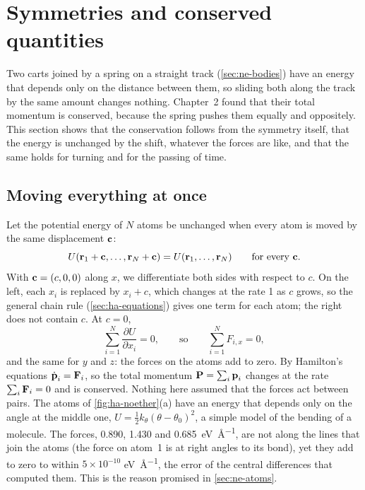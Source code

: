 \section{Symmetries and conserved quantities}
\label{sec:ha-noether}

Two carts joined by a spring on a straight track (\cref{sec:ne-bodies})
have an energy that depends only on the distance between them, so sliding
both along the track by the same amount changes nothing. Chapter~2 found
that their total momentum is conserved, because the spring pushes them
equally and oppositely. This section shows that the conservation follows
from the symmetry itself, that the energy is unchanged by the shift,
whatever the forces are like, and that the same holds for turning and for
the passing of time.

\subsection*{Moving everything at once}

Let the potential energy of $N$ atoms be unchanged when every atom is
moved by the same displacement $\bm{\mathrm{c}}$:
\begin{equation*}
   U(\bm{\mathrm{r}}_1 + \bm{\mathrm{c}}, \dots, \bm{\mathrm{r}}_N + \bm{\mathrm{c}})
   = U(\bm{\mathrm{r}}_1, \dots, \bm{\mathrm{r}}_N)
   \qquad\text{for every } \bm{\mathrm{c}} .
\end{equation*}
With $\bm{\mathrm{c}} = (c, 0, 0)$ along $x$, we differentiate both sides with
respect to $c$. On the left, each $x_i$ is replaced by $x_i + c$, which
changes at the rate 1 as $c$ grows, so the general chain rule
(\cref{sec:ha-equations}) gives one term for each atom; the right does
not contain $c$. At $c = 0$,
\begin{equation*}
   \sum_{i=1}^{N}\frac{\partial U}{\partial x_i} = 0 ,
   \qquad\text{so}\qquad
   \sum_{i=1}^{N}F_{i,x} = 0 ,
\end{equation*}
and the same for $y$ and $z$: the forces on the atoms add to zero. By
Hamilton's equations $\dot{\bm{\mathrm{p}}}_i = \bm{\mathrm{F}}_i$, so the total momentum
$\bm{\mathrm{P}} = \sum_i\bm{\mathrm{p}}_i$ changes at the rate $\sum_i\bm{\mathrm{F}}_i = 0$ and is
conserved. Nothing here assumed that the forces act between pairs. The
atoms of \cref{fig:ha-noether}(a) have an energy that depends only on the
angle at the middle one, $U = \frac12 k_\theta(\theta - \theta_0)^2$,
a simple model of the bending of a molecule. The forces,
0.890, 1.430 and \SI{0.685}{\electronvolt\per\angstrom}, are not along the
lines that join the atoms (the force on atom~1 is at right angles to its
bond), yet they add to zero to within $5\times10^{-10}$
\si{\electronvolt\per\angstrom}, the error of the central differences
that computed them. This is the reason promised in \cref{sec:ne-atoms}.

